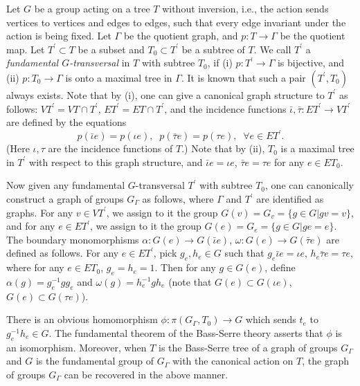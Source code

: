 \documentclass[11pt]{amsart}
\theoremstyle{plain}
\numberwithin{theorem}{section}
\theoremstyle{definition}
\begin{document}
Let $G$ be a group acting on a tree $T$ without inversion, i.e., the action sends vertices to vertices
and edges to edges, such that every edge invariant under the action is being fixed. 
Let $\Gamma$ be the quotient graph, and $p:T\rightarrow \Gamma$ be the quotient map. 
Let $T^\prime\subset T$ be a subset and $T_0\subset T^\prime$ be a subtree of $T$. 
We call $T^\prime$ a {\it fundamental $G$-transversal} in $T$ with subtree $T_0$, if (i) 
$p:T^\prime\rightarrow \Gamma$ is bijective, and (ii) $p:T_0\rightarrow\Gamma$ is onto a maximal tree in $\Gamma$. It is known that such a pair $(T^\prime,T_0)$ always
exists. Note that by (i), one can give a canonical graph structure to $T^\prime$ as follows: 
$VT^\prime=VT\cap T^\prime$, $ET^\prime=ET\cap T^\prime$, and the incidence functions 
$\bar{\iota},\bar{\tau}:ET^\prime\rightarrow VT^\prime$ are defined by the equations 
$$
p(\bar{\iota}e)=p(\iota e),\;\; p(\bar{\tau}e)=p(\tau e), \;\;\forall e\in ET^\prime. 
$$
(Here $\iota,\tau$ are the incidence functions of $T$.) Note that by (ii), $T_0$ is a maximal tree in 
$T^\prime$ with respect to this graph structure, and $\bar{\iota} e=\iota e$, $\bar{\tau} e=\tau e$ for
any $e\in ET_0$. 

Now given any fundamental $G$-transversal $T^\prime$ with subtree $T_0$, one can canonically
construct a graph of groups $G_\Gamma$ as follows, where $\Gamma$ and $T^\prime$ are identified 
as graphs. For any $v\in VT^\prime$, we assign to it the group $G(v)=G_v=\{g\in G|gv=v\}$, and
for any $e\in ET^\prime$, we assign to it the group $G(e)=G_e=\{g\in G|ge=e\}$. The boundary
monomorphisms $\alpha: G(e)\rightarrow G(\bar{\iota} e)$, $\omega: G(e)\rightarrow G(\bar{\tau}e)$ 
are defined as follows. For any $e\in ET^\prime$, pick $g_e,h_e\in G$ such that $g_e\bar{\iota}e=
\iota e$, $h_e\bar{\tau} e=\tau e$, where for any $e\in ET_0$, $g_e=h_e=1$. Then for any
$g\in G(e)$, define $\alpha(g)=g_e^{-1}gg_e$ and $\omega(g)=h_e^{-1}gh_e$ (note that
$G(e)\subset G(\iota e)$, $G(e)\subset G(\tau e)$). 

There is an obvious homomorphism $\phi: \pi(G_\Gamma,T_0)\rightarrow G$ which sends
$t_e$ to $g_e^{-1}h_e\in G$. The fundamental theorem of the Bass-Serre theory asserts that
$\phi$ is an isomorphism. Moreover, when $T$ is the Bass-Serre tree of a graph of groups 
$G_\Gamma$ and $G$ is the fundamental group of $G_\Gamma$ with the canonical action 
on $T$, the graph of groups $G_\Gamma$ can be recovered in the above manner. 
\end{document}
